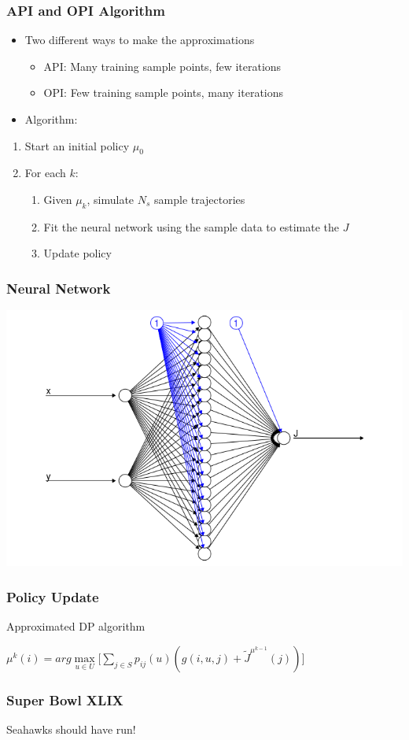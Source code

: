 \documentclass{beamer}
\begin{document}
\begin{frame}
\frametitle{API and OPI Algorithm}
\begin{itemize}
\item Two different ways to make the approximations
\begin{itemize}
\item API: Many training sample points, few iterations
\item OPI: Few training sample points, many iterations
\end{itemize}
\item Algorithm:
\end{itemize}
\begin{enumerate}
\item Start an initial policy $\mu_{0}$
\item For each $k$:
\begin{enumerate}
\item Given $\mu_{k}$, simulate $N_{s}$ sample trajectories
\item Fit the neural network using the sample data to estimate the $J$
\item Update policy
\end{enumerate}
\end{enumerate}
\end{frame}

\begin{frame}
\frametitle{Neural Network}
\includegraphics[scale=0.65]{neuralnet}
\end{frame}

\begin{frame}
\frametitle{Policy Update}
\begin{block}{Approximated DP algorithm}
\begin{center}
$\mu^{k}(i) = arg\max\limits_{u \in U} \Big[ \sum\limits_{j \in S} p_{ij}(u)(g(i,u,j) +  \widetilde{J}^{\mu^{k-1}}(j))\Big]$
\end{center}
\end{block}
\end{frame}

\begin{frame}
\frametitle{Super Bowl XLIX}
\begin{center}
Seahawks should have run!
\end{center}
\end{frame}
\end{document}
